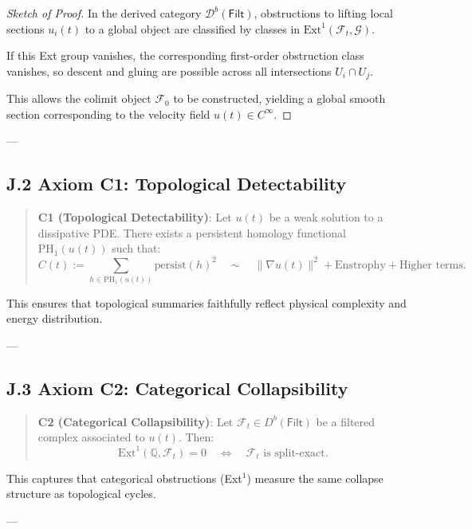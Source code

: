 \documentclass[11pt]{article}
\theoremstyle{definition}
\begin{document}
\begin{proof}[Sketch of Proof]
In the derived category \( \mathcal{D}^b(\mathsf{Filt}) \), obstructions to lifting local sections \( u_i(t) \)  
to a global object are classified by classes in \( \mathrm{Ext}^1(\mathcal{F}_t, \mathcal{G}) \).

If this Ext group vanishes, the corresponding first-order obstruction class vanishes,  
so descent and gluing are possible across all intersections \( U_i \cap U_j \).

This allows the colimit object \( \mathcal{F}_0 \) to be constructed, yielding a global smooth section  
corresponding to the velocity field \( u(t) \in C^\infty \).
\end{proof}


---

\subsection*{J.2 Axiom C1: Topological Detectability}

\begin{quote}
\textbf{C1 (Topological Detectability)}:  
Let \( u(t) \) be a weak solution to a dissipative PDE.  
There exists a persistent homology functional \( \mathrm{PH}_1(u(t)) \) such that:
\[
C(t) := \sum_{h \in \mathrm{PH}_1(u(t))} \mathrm{persist}(h)^2 \quad \sim \quad \|\nabla u(t)\|^2 + \text{Enstrophy} + \text{Higher terms}.
\]
\end{quote}

This ensures that topological summaries faithfully reflect physical complexity and energy distribution.

---

\subsection*{J.3 Axiom C2: Categorical Collapsibility}

\begin{quote}
\textbf{C2 (Categorical Collapsibility)}:  
Let \( \mathcal{F}_t \in D^b(\mathsf{Filt}) \) be a filtered complex associated to \( u(t) \).  
Then:
\[
\mathrm{Ext}^1(\mathbb{Q}, \mathcal{F}_t) = 0 \quad \Longleftrightarrow \quad \mathcal{F}_t \text{ is split-exact}.
\]
\end{quote}

This captures that categorical obstructions (Ext$^1$) measure the same collapse structure as topological cycles.

---
\end{document}

